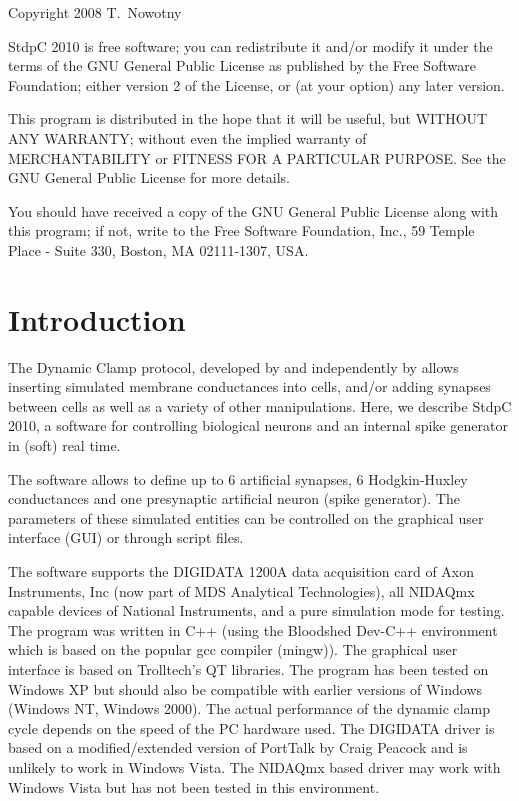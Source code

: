 \documentclass{article}
\begin{document}
Copyright 2008 T.~Nowotny

StdpC 2010 is free software; you can redistribute it and/or modify  
it under the terms of the GNU General Public License as published by 
the Free Software Foundation; either version 2 of the License, or 
(at your option) any later version.                               

This program is distributed in the hope that it will be useful,
but WITHOUT ANY WARRANTY; without even the implied warranty of
MERCHANTABILITY or FITNESS FOR A PARTICULAR PURPOSE.  See the 
GNU General Public License for more details.

You should have received a copy of the GNU General Public License
along with this program; if not, write to the
Free Software Foundation, Inc., 59 Temple Place - Suite 330, Boston,
MA  02111-1307, USA.

\newpage
\section{Introduction}
           
The Dynamic Clamp protocol, developed by \cite{Sharp1993} and
independently by \cite{Robinson1993} allows inserting simulated
membrane conductances into cells, and/or adding synapses between cells
as well as a variety of other manipulations. Here, we describe StdpC
2010, a software for controlling biological neurons and an internal
spike generator in (soft) real time.

The software allows to define up to $6$ artificial synapses, $6$
Hodgkin-Huxley conductances \cite{Hodgkin1949} and one presynaptic
artificial neuron (spike generator). The parameters of these simulated
entities can be controlled on the graphical user interface (GUI) or
through script files.  
 
The software supports the DIGIDATA 1200A data acquisition card of Axon
Instruments, Inc (now part of MDS Analytical Technologies), all
NIDAQmx capable devices of National Instruments, and a pure simulation
mode for testing. The program was written in C++ (using the Bloodshed
Dev-C++ environment which is based on the popular gcc compiler
(mingw)). The graphical user interface is based on Trolltech's QT
libraries. The program has been tested on Windows XP but should also
be compatible with earlier versions of Windows (Windows NT, Windows
2000). The actual performance of the dynamic clamp cycle depends
on the speed of the PC hardware used. The DIGIDATA driver is
based on a modified/extended version of PortTalk by Craig Peacock and
is unlikely to work in Windows Vista. The NIDAQmx based driver may
work with Windows Vista but has not been tested in this environment.
\end{document}
